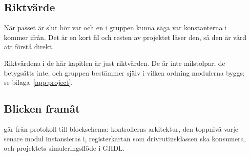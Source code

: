 \subsection*{Riktvärde}
När passet är slut bör var och en i gruppen kunna säga var konstanterna i  kommer
ifrån. Det är en kort fil och resten av projektet läser den, så den är värd att förstå direkt.

Riktvärdena i de här kapitlen är just riktvärden. De är inte milstolpar, de betygsätts inte, och
gruppen bestämmer själv i vilken ordning modulerna byggs; se bilaga~\ref{app:project}.

\subsection*{Blicken framåt}
 går från protokoll till blockschema: kontrollerns arkitektur, den toppnivå varje
senare modul instansieras i, registerkartan som drivrutinsklassen ska konsumera, och projektets
simuleringsflöde i GHDL.
